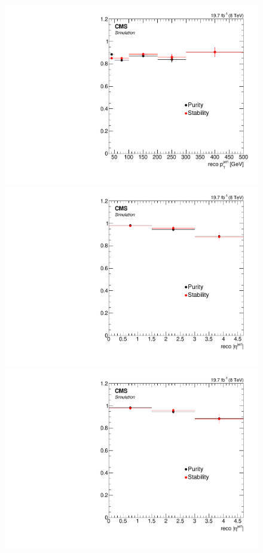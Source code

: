 \begin{figure}[hbtp]
\begin{center}
    \includegraphics[width=0.8\cmsFigWidth]{Figures/Unfolding/BinMigration/PurityStability_2e2m_PtJet1_Mad}
    \includegraphics[width=0.8\cmsFigWidth]{Figures/Unfolding/BinMigration/PurityStability_4m_EtaJet1_Mad}
    \includegraphics[width=0.8\cmsFigWidth]{Figures/Unfolding/BinMigration/PurityStability_4e_EtaJet1_Mad}

\end{center}
\end{figure}
